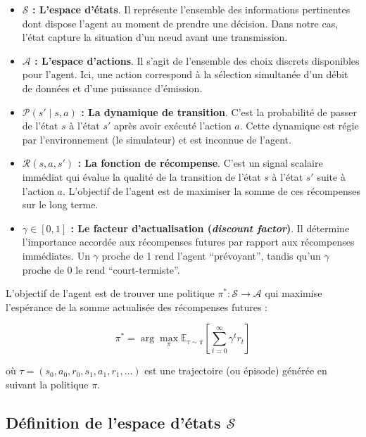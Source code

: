 \begin{itemize}
	\item \textbf{$\mathcal{S}$ : L'espace d'états}. Il représente l'ensemble des informations pertinentes dont dispose l'agent au moment de prendre une décision. Dans notre cas, l'état capture la situation d'un nœud avant une transmission.
	
	\item \textbf{$\mathcal{A}$ : L'espace d'actions}. Il s'agit de l'ensemble des choix discrets disponibles pour l'agent. Ici, une action correspond à la sélection simultanée d'un débit de données et d'une puissance d'émission.
	
	\item \textbf{$\mathcal{P}(s' \mid s, a)$ : La dynamique de transition}. C'est la probabilité de passer de l'état $s$ à l'état $s'$ après avoir exécuté l'action $a$. Cette dynamique est régie par l'environnement (le simulateur) et est inconnue de l'agent.
	
	\item \textbf{$\mathcal{R}(s, a, s')$ : La fonction de récompense}. C'est un signal scalaire immédiat qui évalue la qualité de la transition de l'état $s$ à l'état $s'$ suite à l'action $a$. L'objectif de l'agent est de maximiser la somme de ces récompenses sur le long terme.
	
	\item \textbf{$\gamma \in [0, 1]$ : Le facteur d'actualisation (\textit{discount factor})}. Il détermine l'importance accordée aux récompenses futures par rapport aux récompenses immédiates. Un $\gamma$ proche de 1 rend l'agent ``prévoyant'', tandis qu'un $\gamma$ proche de 0 le rend ``court-termiste''.
\end{itemize}

L'objectif de l'agent est de trouver une politique $\pi^* : \mathcal{S} \rightarrow \mathcal{A}$ qui maximise l'espérance de la somme actualisée des récompenses futures :

\begin{equation}
	\pi^* = \arg\max_{\pi} \mathbb{E}_{\tau \sim \pi} \left[ \sum_{t=0}^{\infty} \gamma^t r_t \right]
\end{equation}

où $\tau = (s_0, a_0, r_0, s_1, a_1, r_1, \ldots)$ est une trajectoire (ou épisode) générée en suivant la politique $\pi$.

\subsection{\texorpdfstring{Définition de l'espace d'états $\mathcal{S}$}{Définition de l'espace d'états}}
\label{subsec:espace-etats}

